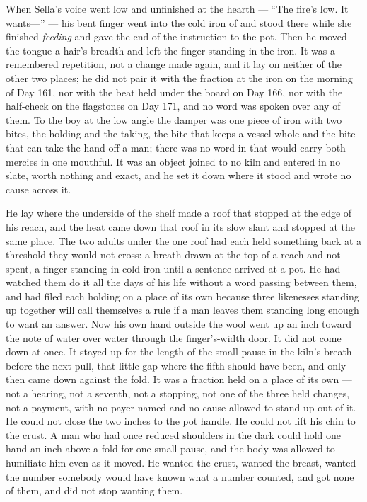 When Sella's voice went low and unfinished at the hearth --- “The fire's low. It wants---” --- his bent finger went into the cold iron of  and stood there while she finished \emph{feeding} and gave the end of the instruction to the pot. Then he moved the tongue a hair's breadth and left the finger standing in the iron. It was a remembered repetition, not a change made again, and it lay on neither of the other two places; he did not pair it with the fraction at the iron on the morning of Day 161, nor with the beat held under the board on Day 166, nor with the half-check on the flagstones on Day 171, and no word was spoken over any of them. To the boy at the low angle the damper was one piece of iron with two bites, the holding and the taking, the bite that keeps a vessel whole and the bite that can take the hand off a man; there was no word in  that would carry both mercies in one mouthful. It was an object joined to no kiln and entered in no slate, worth nothing and exact, and he set it down where it stood and wrote no cause across it.

He lay where the underside of the shelf made a roof that stopped at the edge of his reach, and the heat came down that roof in its slow slant and stopped at the same place. The two adults under the one roof had each held something back at a threshold they would not cross: a breath drawn at the top of a reach and not spent, a finger standing in cold iron until a sentence arrived at a pot. He had watched them do it all the days of his life without a word passing between them, and had filed each holding on a place of its own because three likenesses standing up together will call themselves a rule if a man leaves them standing long enough to want an answer. Now his own hand outside the wool went up an inch toward the note of water over water through the finger's-width door. It did not come down at once. It stayed up for the length of the small pause in the kiln's breath before the next pull, that little gap where the fifth should have been, and only then came down against the fold. It was a fraction held on a place of its own --- not a hearing, not a seventh, not a stopping, not one of the three held changes, not a payment, with no payer named and no cause allowed to stand up out of it. He could not close the two inches to the pot handle. He could not lift his chin to the crust. A man who had once reduced shoulders in the dark could hold one hand an inch above a fold for one small pause, and the body was allowed to humiliate him even as it moved. He wanted the crust, wanted the breast, wanted the number somebody would have known what a number counted, and got none of them, and did not stop wanting them.

